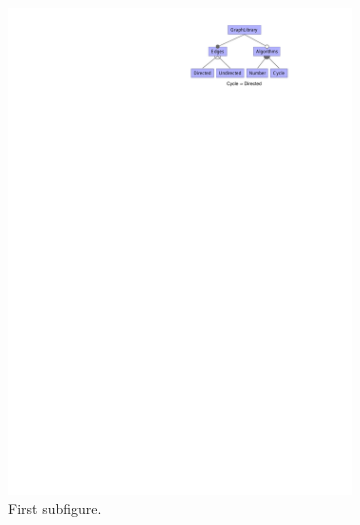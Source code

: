 \clearpage
\begin{figure}
   \begin{subfigure}[c]{0.33\linewidth}
      \includegraphics[width=\linewidth]{img/example.pdf}
      \caption{First subfigure.}
      \label{fig:first}
  \end{subfigure}\hfill
  \begin{subfigure}[c]{0.33\linewidth}

\end{subfigure}
\end{figure}
